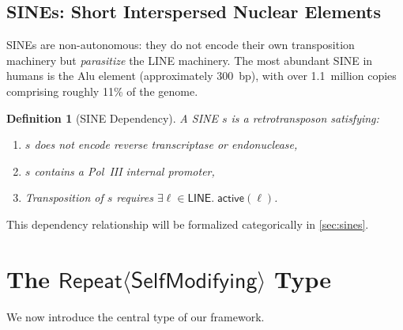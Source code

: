 \documentclass[12pt,a4paper]{article}
\newtheorem{definition}[theorem]{Definition}
\newcommand{\Repeat}{\mathsf{Repeat}}
\newcommand{\LINE}{\mathsf{LINE}}
\begin{document}
\subsection{SINEs: Short Interspersed Nuclear Elements}

SINEs are non-autonomous: they do not encode their own transposition machinery but
\emph{parasitize} the LINE machinery. The most abundant SINE in humans is the Alu
element (approximately 300~bp), with over 1.1~million copies comprising roughly 11\%
of the genome.

\begin{definition}[SINE Dependency]\label{def:sine-dep}
A SINE $s$ is a retrotransposon satisfying:
\begin{enumerate}[label=(\roman*)]
  \item $s$ does not encode reverse transcriptase or endonuclease,
  \item $s$ contains a Pol~III internal promoter,
  \item Transposition of $s$ requires $\exists \ell \in \LINE.\; \mathsf{active}(\ell)$.
\end{enumerate}
\end{definition}

This dependency relationship will be formalized categorically in \cref{sec:sines}.


\section{The $\Repeat\langle\mathsf{SelfModifying}\rangle$ Type}\label{sec:repeat-type}

We now introduce the central type of our framework.
\end{document}

